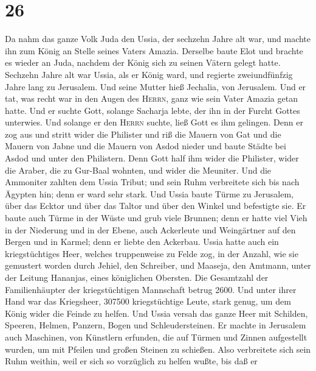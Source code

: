 \hypertarget{section-25}{%
\section{26}\label{section-25}}

 Da nahm das ganze Volk Juda den Ussia, der sechzehn Jahre
alt war, und machte ihn zum König an Stelle seines Vaters Amazia.
 Derselbe baute Elot und brachte es wieder an Juda,
nachdem der König sich zu seinen Vätern gelegt hatte. 
Sechzehn Jahre alt war Ussia, als er König ward, und regierte
zweiundfünfzig Jahre lang zu Jerusalem. Und seine Mutter hieß Jechalia,
von Jerusalem.  Und er tat, was recht war in den Augen des
\textsc{Herrn}, ganz wie sein Vater Amazia getan hatte. 
Und er suchte Gott, solange Sacharja lebte, der ihn in der Furcht Gottes
unterwies. Und solange er den \textsc{Herrn} suchte, ließ Gott es ihm
gelingen.  Denn er zog aus und stritt wider die Philister
und riß die Mauern von Gat und die Mauern von Jabne und die Mauern von
Asdod nieder und baute Städte bei Asdod und unter den Philistern.
 Denn Gott half ihm wider die Philister, wider die Araber,
die zu Gur-Baal wohnten, und wider die Meuniter.  Und die
Ammoniter zahlten dem Ussia Tribut; und sein Ruhm verbreitete sich bis
nach Ägypten hin; denn er ward sehr stark.  Und Ussia
baute Türme zu Jerusalem, über das Ecktor und über das Taltor und über
den Winkel und befestigte sie.  Er baute auch Türme in
der Wüste und grub viele Brunnen; denn er hatte viel Vieh in der
Niederung und in der Ebene, auch Ackerleute und Weingärtner auf den
Bergen und in Karmel; denn er liebte den Ackerbau.  Ussia
hatte auch ein kriegstüchtiges Heer, welches truppenweise zu Felde zog,
in der Anzahl, wie sie gemustert worden durch Jehiel, den Schreiber, und
Maaseja, den Amtmann, unter der Leitung Hananjas, eines königlichen
Obersten.  Die Gesamtzahl der Familienhäupter der
kriegstüchtigen Mannschaft betrug 2600.  Und unter ihrer
Hand war das Kriegsheer, 307500 kriegstüchtige Leute, stark genug, um
dem König wider die Feinde zu helfen.  Und Ussia versah
das ganze Heer mit Schilden, Speeren, Helmen, Panzern, Bogen und
Schleudersteinen.  Er machte in Jerusalem auch Maschinen,
von Künstlern erfunden, die auf Türmen und Zinnen aufgestellt wurden, um
mit Pfeilen und großen Steinen zu schießen. Also verbreitete sich sein
Ruhm weithin, weil er sich so vorzüglich zu helfen wußte, bis daß er
